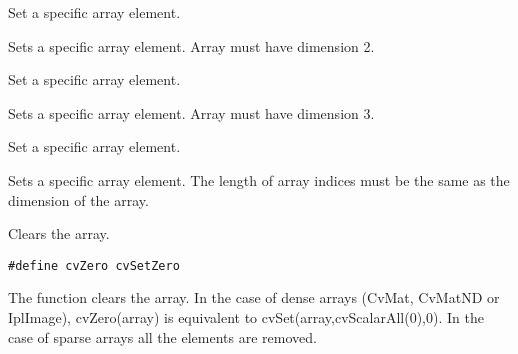 Set a specific array element.


\begin{description}
\end{description}

Sets a specific array element.  Array must have dimension 2.

Set a specific array element.


\begin{description}
\end{description}

Sets a specific array element.  Array must have dimension 3.

Set a specific array element.


\begin{description}
\end{description}

Sets a specific array element.  The length of array indices must be the same as the dimension of the array.
\fi %

Clears the array.


\ifC
\begin{lstlisting}
#define cvZero cvSetZero
\end{lstlisting}
\fi

\begin{description}
\end{description}

The function clears the array. In the case of dense arrays (CvMat, CvMatND or IplImage), cvZero(array) is equivalent to cvSet(array,cvScalarAll(0),0).
In the case of sparse arrays all the elements are removed.

